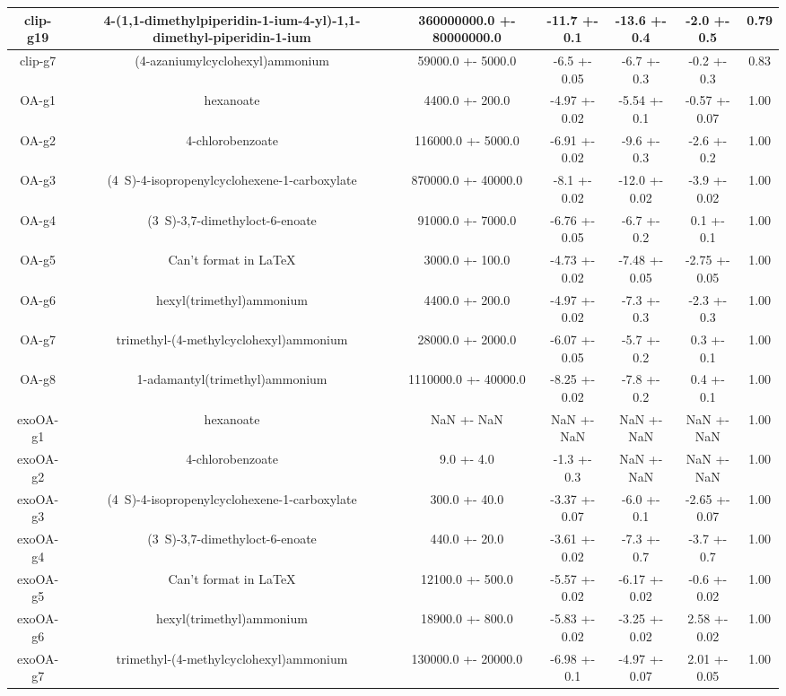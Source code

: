 \documentclass{article}
\begin{document}
\begin{center}
\begin{tabu}{| c | c | c | c | c | c | c |}
\hline
clip-g19 & 4-(1,1-dimethylpiperidin-1-ium-4-yl)-1,1-dimethyl-piperidin-1-ium & 360000000.0 +- 80000000.0 & -11.7 +- 0.1 & -13.6 +- 0.4 & -2.0 +- 0.5 &  0.79 \\
\hline
clip-g7 & (4-azaniumylcyclohexyl)ammonium & 59000.0 +- 5000.0 & -6.5 +- 0.05 & -6.7 +- 0.3 & -0.2 +- 0.3 &  0.83 \\
\hline
\hline
OA-g1 & hexanoate & 4400.0 +- 200.0 & -4.97 +- 0.02 & -5.54 +- 0.1 & -0.57 +- 0.07 &  1.00 \\
\hline
OA-g2 & 4-chlorobenzoate & 116000.0 +- 5000.0 & -6.91 +- 0.02 & -9.6 +- 0.3 & -2.6 +- 0.2 &  1.00 \\
\hline
OA-g3 & (4~{S})-4-isopropenylcyclohexene-1-carboxylate & 870000.0 +- 40000.0 & -8.1 +- 0.02 & -12.0 +- 0.02 & -3.9 +- 0.02 &  1.00 \\
\hline
OA-g4 & (3~{S})-3,7-dimethyloct-6-enoate & 91000.0 +- 7000.0 & -6.76 +- 0.05 & -6.7 +- 0.2 & 0.1 +- 0.1 &  1.00 \\
\hline
OA-g5 & Can't format in LaTeX & 3000.0 +- 100.0 & -4.73 +- 0.02 & -7.48 +- 0.05 & -2.75 +- 0.05 &  1.00 \\
\hline
OA-g6 & hexyl(trimethyl)ammonium & 4400.0 +- 200.0 & -4.97 +- 0.02 & -7.3 +- 0.3 & -2.3 +- 0.3 &  1.00 \\
\hline
OA-g7 & trimethyl-(4-methylcyclohexyl)ammonium & 28000.0 +- 2000.0 & -6.07 +- 0.05 & -5.7 +- 0.2 & 0.3 +- 0.1 &  1.00 \\
\hline
OA-g8 & 1-adamantyl(trimethyl)ammonium & 1110000.0 +- 40000.0 & -8.25 +- 0.02 & -7.8 +- 0.2 & 0.4 +- 0.1 &  1.00 \\
\hline
\hline
exoOA-g1 & hexanoate & NaN +- NaN & NaN +- NaN & NaN +- NaN & NaN +- NaN &  1.00 \\
\hline
exoOA-g2 & 4-chlorobenzoate & 9.0 +- 4.0 & -1.3 +- 0.3 & NaN +- NaN & NaN +- NaN &  1.00 \\
\hline
exoOA-g3 & (4~{S})-4-isopropenylcyclohexene-1-carboxylate & 300.0 +- 40.0 & -3.37 +- 0.07 & -6.0 +- 0.1 & -2.65 +- 0.07 &  1.00 \\
\hline
exoOA-g4 & (3~{S})-3,7-dimethyloct-6-enoate & 440.0 +- 20.0 & -3.61 +- 0.02 & -7.3 +- 0.7 & -3.7 +- 0.7 &  1.00 \\
\hline
exoOA-g5 & Can't format in LaTeX & 12100.0 +- 500.0 & -5.57 +- 0.02 & -6.17 +- 0.02 & -0.6 +- 0.02 &  1.00 \\
\hline
exoOA-g6 & hexyl(trimethyl)ammonium & 18900.0 +- 800.0 & -5.83 +- 0.02 & -3.25 +- 0.02 & 2.58 +- 0.02 &  1.00 \\
\hline
exoOA-g7 & trimethyl-(4-methylcyclohexyl)ammonium & 130000.0 +- 20000.0 & -6.98 +- 0.1 & -4.97 +- 0.07 & 2.01 +- 0.05 &  1.00 \\

\end{tabu}
\end{center}
\end{document}
